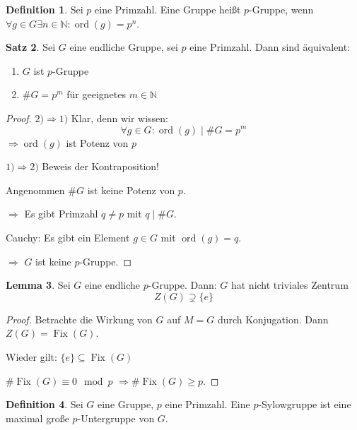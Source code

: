\documentclass[12pt,parskip=full]{scrartcl}
\newcommand{\setN}{\mathbb{N}}
\newcommand{\heading}{\underline}
\theoremstyle{definition}
\newtheorem{theorem}{Satz}[section]
\newtheorem{lemma}[theorem]{Lemma}
\newtheorem{definition}[theorem]{Definition}
\theoremstyle{remark}
\begin{document}
	\begin{definition}
		Sei $p$ eine Primzahl. Eine Gruppe heißt $p$-Gruppe, wenn $\forall g \in G \exists n \in \setN: \operatorname{ord}(g) = p^n$.
	\end{definition}

	\begin{theorem}
		Sei $G$ eine endliche Gruppe, sei $p$ eine Primzahl. Dann sind äquivalent:
		\begin{enumerate}
			\item $G$ ist $p$-Gruppe
			\item $\#G = p^m$ für geeignetes $m \in \setN$
		\end{enumerate}
	\end{theorem}

	\begin{proof}
		\heading{$2) \Rightarrow 1)$} Klar, denn wir wissen:
		\begin{equation*}
			\forall g \in G: \operatorname{ord}(g) \mid \#G = p^m
		\end{equation*}
		$\Rightarrow \operatorname{ord}(g)$ ist Potenz von $p$
		
		\heading{$1) \Rightarrow 2)$} Beweis der Kontraposition!
		
		Angenommen $\#G$ ist keine Potenz von $p$.
		
		$\Rightarrow$ Es gibt Primzahl $q \neq p$ mit $q \mid \#G$.
		
		Cauchy: Es gibt ein Element $g \in G$ mit $\operatorname{ord}(g) = q$.
		
		$\Rightarrow$ $G$ ist keine $p$-Gruppe.
	\end{proof}

	\begin{lemma}
		Sei $G$ eine endliche $p$-Gruppe. Dann: $G$ hat nicht triviales Zentrum
		\begin{equation*}
			Z(G) \supsetneq \{ e \}
		\end{equation*}
	\end{lemma}

	\begin{proof}
		Betrachte die Wirkung von $G$ auf $M = G$ durch Konjugation. Dann $Z(G) = \operatorname{Fix}(G)$.
		
		Wieder gilt: $\{ e \} \subseteq \operatorname{Fix}(G)$
		
		$\#\operatorname{Fix}(G) \equiv 0 \mod p$ $\Rightarrow \#\operatorname{Fix}(G) \geq p$.
	\end{proof}

	\begin{definition}
		Sei $G$ eine Gruppe, $p$ eine Primzahl. Eine $p$-Sylowgruppe ist eine maximal große $p$-Untergruppe von $G$.
	\end{definition}
\end{document}

